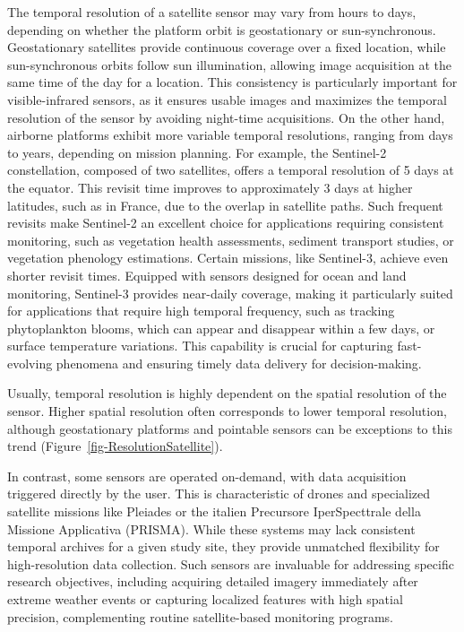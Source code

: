 \documentclass[
  letterpaper,
  11pt,
  english,
  singlespacing,
  headsepline]{MastersDoctoralThesis}
\begin{document}
\begin{spacing}{1.5}
The temporal resolution of a satellite sensor may vary from hours to
days, depending on whether the platform orbit is geostationary or
sun-synchronous. Geostationary satellites provide continuous coverage
over a fixed location, while sun-synchronous orbits follow sun
illumination, allowing image acquisition at the same time of the day for
a location. This consistency is particularly important for
visible-infrared sensors, as it ensures usable images and maximizes the
temporal resolution of the sensor by avoiding night-time acquisitions.
On the other hand, airborne platforms exhibit more variable temporal
resolutions, ranging from days to years, depending on mission planning.
For example, the Sentinel-2 constellation, composed of two satellites,
offers a temporal resolution of 5 days at the equator. This revisit time
improves to approximately 3 days at higher latitudes, such as in France,
due to the overlap in satellite paths. Such frequent revisits make
Sentinel-2 an excellent choice for applications requiring consistent
monitoring, such as vegetation health assessments, sediment transport
studies, or vegetation phenology estimations. Certain missions, like
Sentinel-3, achieve even shorter revisit times. Equipped with sensors
designed for ocean and land monitoring, Sentinel-3 provides near-daily
coverage, making it particularly suited for applications that require
high temporal frequency, such as tracking phytoplankton blooms, which
can appear and disappear within a few days, or surface temperature
variations. This capability is crucial for capturing fast-evolving
phenomena and ensuring timely data delivery for decision-making.

Usually, temporal resolution is highly dependent on the spatial
resolution of the sensor. Higher spatial resolution often corresponds to
lower temporal resolution, although geostationary platforms and
pointable sensors can be exceptions to this trend
(Figure~\ref{fig-ResolutionSatellite}).

In contrast, some sensors are operated on-demand, with data acquisition
triggered directly by the user. This is characteristic of drones and
specialized satellite missions like Pleiades or the italien Precursore
IperSpecttrale della Missione Applicativa (PRISMA). While these systems
may lack consistent temporal archives for a given study site, they
provide unmatched flexibility for high-resolution data collection. Such
sensors are invaluable for addressing specific research objectives,
including acquiring detailed imagery immediately after extreme weather
events or capturing localized features with high spatial precision,
complementing routine satellite-based monitoring programs.


\end{spacing}
\end{document}

